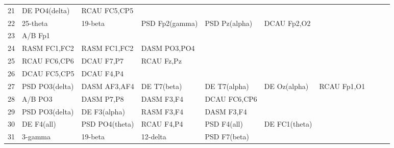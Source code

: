 \begin{landscape}
\begin{table}[]
\begin{tabular}{l|llllllll}
21       & DE PO4(delta)  & RCAU FC5,CP5   &                &                &                &                &                &                &               &              \\
22       & 25-theta       & 19-beta        & PSD Fp2(gamma) & PSD Pz(alpha)  & DCAU Fp2,O2    &                &                &                &               &              \\
23       & A/B Fp1        &                &                &                &                &                &                &                &               &              \\
24       & RASM FC1,FC2   & RASM FC1,FC2   & DASM PO3,PO4   &                &                &                &                &                &               &              \\
25       & RCAU FC6,CP6   & DCAU F7,P7     & RCAU Fz,Pz     &                &                &                &                &                &               &              \\
26       & DCAU FC5,CP5   & DCAU F4,P4     &                &                &                &                &                &                &               &              \\
27       & PSD PO3(delta) & DASM AF3,AF4   & DE T7(beta)    & DE T7(alpha)   & DE Oz(alpha)   & RCAU Fp1,O1    &                &                &               &              \\
28       & A/B PO3        & DASM P7,P8     & DASM F3,F4     & DCAU FC6,CP6   &                &                &                &                &               &              \\
29       & PSD PO3(delta) & DE F3(alpha)   & RASM F3,F4     & DASM F3,F4     &                &                &                &                &               &              \\
30       & DE F4(all)     & PSD PO4(theta) & RCAU F4,P4     & PSD F4(all)    & DE FC1(theta)  &                &                &                &               &              \\
31       & 3-gamma        & 19-beta        & 12-delta       & PSD F7(beta)   &                &                &                &                &               &              \\
\end{tabular}
\end{table}
\end{landscape}
\clearpage
